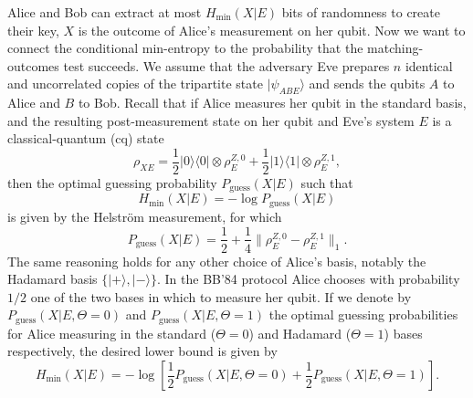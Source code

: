 \documentclass[a4paper,10pt,landscape,twocolumn]{scrartcl}
\begin{document}
\begin{exercise}
Alice and Bob can extract at most $H_{\text{min}}(X|E)$ bits of randomness to create their key, $X$ is the outcome of Alice's measurement on her qubit. Now we want to connect the conditional min-entropy to the probability that the matching-outcomes test succeeds. We assume that the adversary Eve prepares $n$ identical and uncorrelated copies of the tripartite state $|\psi _{ABE}\rangle$ and sends the qubits $A$ to Alice and $B$ to Bob.
Recall that if Alice measures her qubit in the standard basis, and the resulting post-measurement state on her qubit and Eve's system $E$ is a classical-quantum (cq) state
\begin{equation}
\rho _{XE} = \frac{1}{2}|0\rangle \langle 0| \otimes \rho _ E^{Z,0}+\frac{1}{2}|1\rangle \langle 1| \otimes \rho _ E^{Z,1},
\end{equation}
then the optimal guessing probability $P_{\text{guess}}(X|E)$ such that
\begin{equation}
H_{\min}(X|E) = - \log P_{\text{guess}}(X|E)
\end{equation}
is given by the Helstr\"om measurement, for which
\begin{equation}
P_{\text{guess}}(X|E) = \frac{1}{2}+\frac{1}{4}\| \rho _ E^{Z,0}-\rho _ E^{Z,1}\| _1.
\end{equation}
The same reasoning holds for any other choice of Alice's basis, notably the Hadamard basis $\{ |+\rangle ,|-\rangle \}$. In the BB'84 protocol Alice chooses with probability $1/2$ one of the two bases in which to measure her qubit. If we denote by $P_{\text{guess}}(X|E,\Theta =0)$ and $P_{\text{guess}}(X|E,\Theta =1)$ the optimal guessing probabilities for Alice measuring in the standard ($\Theta =0$) and Hadamard ($\Theta =1$) bases respectively, the desired lower bound is given by
\begin{equation}
H_{\min}(X|E ) = -\log \left[\frac{1}{2}P_{\text{guess}}(X|E,\Theta =0)+\frac{1}{2}P_{\text{guess}}(X|E,\Theta =1)\right].
\end{equation}




\end{exercise}
\end{document}
